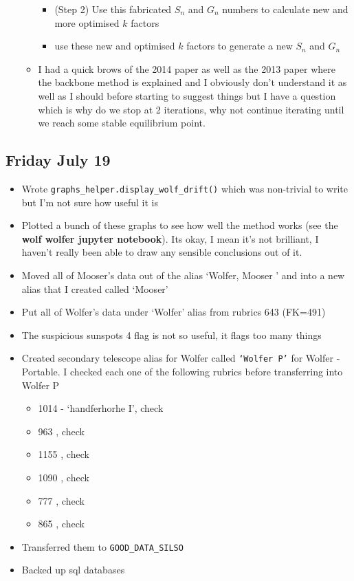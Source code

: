 \documentclass[12pt]{article}
\begin{document}
\begin{itemize}
\begin{itemize}
\begin{itemize}
            \item (Step 2) Use this fabricated $S_n$ and $G_n$ numbers to calculate new and more optimised $k$ factors 
            \item use these new and optimised $k$ factors to generate a new $S_n$ and $G_n$
        \end{itemize}
        \item I had a quick brows of the 2014 paper as well as the 2013 paper where the backbone method is explained and I obviously don't understand it as well as I should before starting to suggest things but I have a question which is why do we stop at 2 iterations, why not continue iterating until we reach some stable equilibrium point.
    \end{itemize}
\end{itemize}

\subsection{Friday July 19}
\begin{itemize}
    \item Wrote \texttt{graphs\_helper.display\_wolf\_drift()} which was non-trivial to write but I'm not sure how useful it is 
    \item Plotted a bunch of these graphs to see how well the method works (see the \textbf{wolf wolfer jupyter notebook}). Its okay, I mean it's not brilliant, I haven't really been able to draw any sensible conclusions out of it.
    \item Moved all of Mooser's data out of the alias `Wolfer, Mooser ' and into a new alias that I created called `Mooser'
    \item Put all of Wolfer's data under `Wolfer' alias from rubrics 643 (FK=491)
    \item The suspicious sunspots 4 flag is not so useful, it flags too many things
    \item Created secondary telescope alias for Wolfer called \texttt{`Wolfer P'} for Wolfer - Portable. I checked each one of the following rubrics before transferring into Wolfer P
    \begin{itemize}
        \item 1014 - `handferhorhe I', check
        \item 963 , check
        \item 1155 , check
        \item 1090 , check
        \item 777 , check
        \item 865 , check
    \end{itemize}
    \item Transferred them to \texttt{GOOD\_DATA\_SILSO}
    \item Backed up sql databases
\end{itemize}
\end{document}
